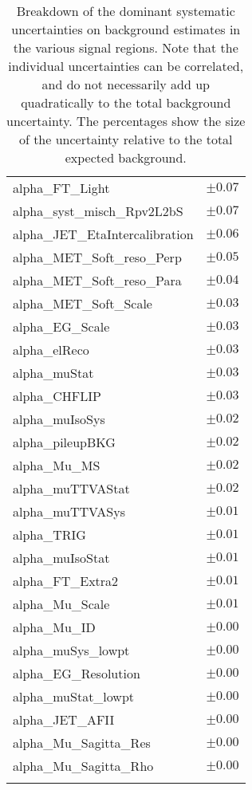 \begin{table}
\begin{center}
\begin{tabular*}{\textwidth}{@{\extracolsep{\fill}}lc}
alpha\_FT\_Light         & $\pm 0.07$       \\
alpha\_syst\_misch\_Rpv2L2bS         & $\pm 0.07$       \\
alpha\_JET\_EtaIntercalibration         & $\pm 0.06$       \\
alpha\_MET\_Soft\_reso\_Perp         & $\pm 0.05$       \\
alpha\_MET\_Soft\_reso\_Para         & $\pm 0.04$       \\
alpha\_MET\_Soft\_Scale         & $\pm 0.03$       \\
alpha\_EG\_Scale         & $\pm 0.03$       \\
alpha\_elReco         & $\pm 0.03$       \\
alpha\_muStat         & $\pm 0.03$       \\
alpha\_CHFLIP         & $\pm 0.03$       \\
alpha\_muIsoSys         & $\pm 0.02$       \\
alpha\_pileupBKG         & $\pm 0.02$       \\
alpha\_Mu\_MS         & $\pm 0.02$       \\
alpha\_muTTVAStat         & $\pm 0.02$       \\
alpha\_muTTVASys         & $\pm 0.01$       \\
alpha\_TRIG         & $\pm 0.01$       \\
alpha\_muIsoStat         & $\pm 0.01$       \\
alpha\_FT\_Extra2         & $\pm 0.01$       \\
alpha\_Mu\_Scale         & $\pm 0.01$       \\
alpha\_Mu\_ID         & $\pm 0.00$       \\
alpha\_muSys\_lowpt         & $\pm 0.00$       \\
alpha\_EG\_Resolution         & $\pm 0.00$       \\
alpha\_muStat\_lowpt         & $\pm 0.00$       \\
alpha\_JET\_AFII         & $\pm 0.00$       \\
alpha\_Mu\_Sagitta\_Res         & $\pm 0.00$       \\
alpha\_Mu\_Sagitta\_Rho         & $\pm 0.00$       \\
\noalign{\smallskip}\hline\noalign{\smallskip}
\end{tabular*}
\end{center}
\caption[Breakdown of uncertainty on background estimates]{
Breakdown of the dominant systematic uncertainties on background estimates in the various signal regions.
Note that the individual uncertainties can be correlated, and do not necessarily add up quadratically to 
the total background uncertainty. The percentages show the size of the uncertainty relative to the total expected background.
\label{table.results.bkgestimate.uncertainties.Rpv2L2bS}}
\end{table}
\clearpage
%